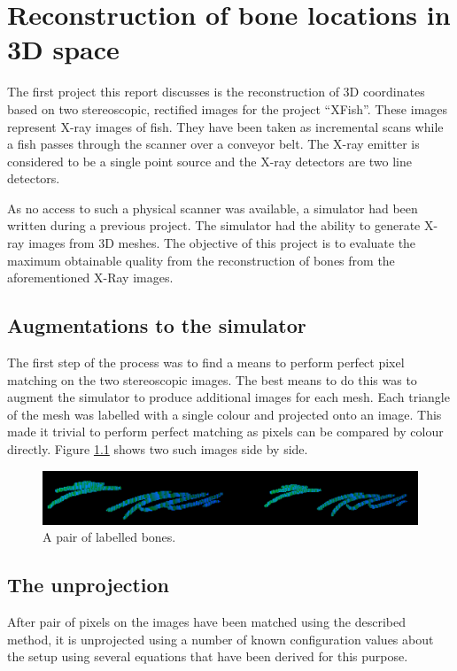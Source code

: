 
\chapter{Reconstruction of bone locations in 3D space}
The first project this report discusses is the reconstruction of 3D coordinates based on two stereoscopic, rectified images for the project ``XFish''. These images represent X-ray images of fish. They have been taken as incremental scans while a fish passes through the scanner over a conveyor belt. The X-ray emitter is considered to be a single point source and the X-ray detectors are two line detectors. 

As no access to such a physical scanner was available, a simulator had been written during a previous project. The simulator had the ability to generate X-ray images from 3D meshes. The objective of this project is to evaluate the maximum obtainable quality from the reconstruction of bones from the aforementioned X-Ray images. 

\section{Augmentations to the simulator}
The first step of the process was to find a means to perform perfect pixel matching on the two stereoscopic images. The best means to do this was to augment the simulator to produce additional images for each mesh. Each triangle of the mesh was labelled with a single colour and projected onto an image. This made it trivial to perform perfect matching as pixels can be compared by colour directly. Figure \ref{fig:labelled} shows two such images side by side. 

\begin{figure}
	\centering
	\includegraphics[width=160mm]{images/fish/test.png}
	\caption{A pair of labelled bones.}
	\label{fig:labelled}
\end{figure}

\section{The unprojection}
After pair of pixels on the images have been matched using the described method, it is unprojected using a number of known configuration values about the setup using several equations that have been derived for this purpose.

